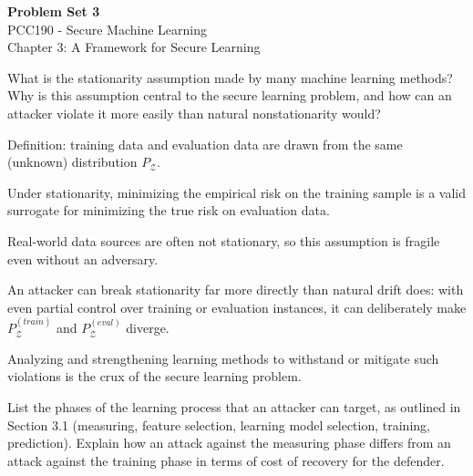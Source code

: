 \documentclass[10pt]{extarticle}
\newcommand{\resposta}[1]{\par\smallskip\noindent #1}
\begin{document}
\begin{center}
    {\LARGE\bfseries\color{darkblue}Problem Set 3}\\[0.3cm]
    {\large\color{accentorange} PCC190 - Secure Machine Learning}\\[0.3cm]
    {\normalsize\color{darkblue} Chapter 3: A Framework for Secure Learning}\\[0.5cm]
\end{center}


\begin{questoes}

\item What is the stationarity assumption made by many machine learning methods? Why is this assumption central to the secure learning problem, and how can an attacker violate it more easily than natural nonstationarity would?

\resposta{
\begin{topicos}
\item Definition: training data and evaluation data are drawn from the same (unknown) distribution $P_{\mathcal{Z}}$.
\item Under stationarity, minimizing the empirical risk on the training sample is a valid surrogate for minimizing the true risk on evaluation data.
\item Real-world data sources are often not stationary, so this assumption is fragile even without an adversary.
\item An attacker can break stationarity far more directly than natural drift does: with even partial control over training or evaluation instances, it can deliberately make $P_{\mathcal{Z}}^{(train)}$ and $P_{\mathcal{Z}}^{(eval)}$ diverge.
\item Analyzing and strengthening learning methods to withstand or mitigate such violations is the crux of the secure learning problem.
\end{topicos}
}

\item List the phases of the learning process that an attacker can target, as outlined in Section 3.1 (measuring, feature selection, learning model selection, training, prediction). Explain how an attack against the measuring phase differs from an attack against the training phase in terms of cost of recovery for the defender.


\end{questoes}
\end{document}
